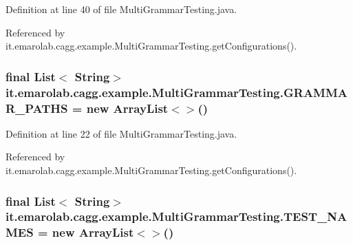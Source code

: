 Definition at line 40 of file Multi\-Grammar\-Testing.\-java.



Referenced by it.\-emarolab.\-cagg.\-example.\-Multi\-Grammar\-Testing.\-get\-Configurations().

\hypertarget{classit_1_1emarolab_1_1cagg_1_1example_1_1MultiGrammarTesting_a77a9e2e6e0c0dd1c6804ce68283ecfdc}{
\subsubsection[{G\-R\-A\-M\-M\-A\-R\-\_\-\-P\-A\-T\-H\-S}]{\setlength{\rightskip}{0pt plus 5cm}final List$<$ String$>$ it.\-emarolab.\-cagg.\-example.\-Multi\-Grammar\-Testing.\-G\-R\-A\-M\-M\-A\-R\-\_\-\-P\-A\-T\-H\-S = new Array\-List$<$$>$()\hspace{0.3cm}{\ttfamily [static]}}}\label{classit_1_1emarolab_1_1cagg_1_1example_1_1MultiGrammarTesting_a77a9e2e6e0c0dd1c6804ce68283ecfdc}


Definition at line 22 of file Multi\-Grammar\-Testing.\-java.



Referenced by it.\-emarolab.\-cagg.\-example.\-Multi\-Grammar\-Testing.\-get\-Configurations().

\hypertarget{classit_1_1emarolab_1_1cagg_1_1example_1_1MultiGrammarTesting_abe72f09d054c583771889d57e44a11a4}{
\subsubsection[{T\-E\-S\-T\-\_\-\-N\-A\-M\-E\-S}]{\setlength{\rightskip}{0pt plus 5cm}final List$<$ String$>$ it.\-emarolab.\-cagg.\-example.\-Multi\-Grammar\-Testing.\-T\-E\-S\-T\-\_\-\-N\-A\-M\-E\-S = new Array\-List$<$$>$()\hspace{0.3cm}{\ttfamily [static]}}}\label{classit_1_1emarolab_1_1cagg_1_1example_1_1MultiGrammarTesting_abe72f09d054c583771889d57e44a11a4}


